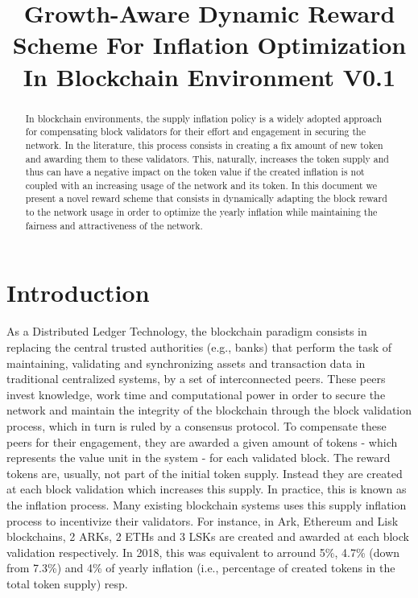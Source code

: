 \documentclass[conference]{IEEEtran}
\begin{document}
\title{Growth-Aware Dynamic Reward Scheme For Inflation Optimization In Blockchain Environment \small{V0.1}}

\author{
\and
{}
}

\maketitle

\begin{abstract}
In blockchain environments, the supply inflation policy is a widely adopted approach for compensating block validators for their effort and engagement in securing the network. In the literature, this process consists in creating a fix amount of new token and awarding them to these validators. This, naturally, increases the token supply and thus can have a negative impact on the token value if the created inflation is not coupled with an increasing usage of the network and its token. In this document we present a novel reward scheme that consists in dynamically adapting the block reward to the network usage in order to optimize the yearly inflation while maintaining the fairness and attractiveness of the network.
\end{abstract}

\section{Introduction}
As a Distributed Ledger Technology, the blockchain paradigm consists in replacing the central trusted authorities (e.g., banks) that perform the task of maintaining, validating and synchronizing assets and transaction data in traditional centralized systems, by a set of interconnected peers. These peers invest knowledge, work time and computational power in order to secure the network and maintain the integrity of the blockchain through the block validation process, which in turn is ruled by a consensus protocol. To compensate these peers for their engagement, they are awarded a given amount of tokens - which represents the value unit in the system - for each validated block. The reward tokens are, usually, not part of the initial token supply. Instead they are created at each block validation which increases this supply. In practice, this is known as the inflation process. Many existing blockchain systems uses this supply inflation process to incentivize their validators. For instance, in Ark, Ethereum and Lisk blockchains, 2 ARKs, 2 ETHs and 3 LSKs are created and awarded at each block validation respectively. In 2018, this was equivalent to arround 5\%, 4.7\% (down from 7.3\%) and 4\% of yearly inflation (i.e., percentage of created tokens in the total token supply) resp.
\end{document}

